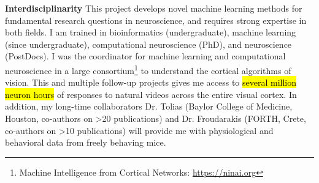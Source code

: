 \documentclass[B2,COG]{ercgrant}
\begin{document}
\textbf{Interdisciplinarity} This project develops novel machine learning methods for fundamental research questions in neuroscience, and requires strong expertise in both fields. 
I am trained in bioinformatics (undergraduate), machine learning (since undergraduate), computational neuroscience (PhD), and neuroscience (PostDocs). 
I was the coordinator for machine learning and computational neuroscience in a large consortium\footnote{Machine Intelligence from Cortical Networks: \url{https://ninai.org}} to understand the cortical algorithms of vision.
This and multiple follow-up projects gives me access to \hl{several million neuron hours} of responses to natural videos across the entire visual cortex. In addition, my long-time collaborators Dr. Tolias (Baylor College of Medicine, Houston, co-authors on >20  publications) and Dr. Froudarakis (FORTH, Crete, co-authors on >10 publications) will provide me with physiological and behavioral data from freely behaving mice. 
\end{document}

